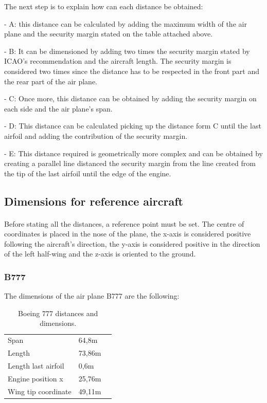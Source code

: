 		The next step is to explain how can each distance be obtained:
		
		- A: this distance can be calculated by adding the maximum width of the air plane and the security margin stated on the table attached above.
		
		- B: It can be dimensioned by adding two times the security margin stated by ICAO's recommendation and the aircraft length. The security margin is considered two times since the distance has to be respected in the front part and the rear part of the air plane.
		
		- C: Once more, this distance can be obtained by adding the security margin on each side and the air plane's span. 
		
		- D: This distance can be calculated picking up the distance form C until the last airfoil and adding the contribution of the security margin.
		
		- E: This distance required is geometrically more complex and can be obtained by creating a parallel line distanced the security margin from the line created from the tip of the last airfoil until the edge of the engine.   
		
		\subsection{Dimensions for reference aircraft}
		\paragraph{}Before stating all the distances, a reference point must be set. The centre of coordinates is placed in the nose of the plane, the x-axis is considered positive following the aircraft's direction, the y-axis is considered positive in the direction of the left half-wing and the z-axis is oriented to the ground.  
		
		\subsubsection{B777}
		The dimensions of the air plane B777 are the following:
		
		\begin{table}[htb]
			\centering
			\begin{tabular}{ll p{5cm}}
				\midrule[2pt]
				Span & 64,8m\\
				Length & 73,86m\\
				Length last airfoil& 0,6m \\
				Engine position x & 25,76m\\
				Wing tip coordinate & 49,11m\\
				\bottomrule[2pt]
			\end{tabular}
			\caption{Boeing 777 distances and dimensions.}
			\label{Boeingdistances}
		\end{table}
		

